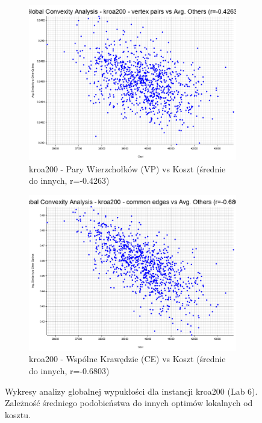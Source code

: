 \documentclass[12pt,a4paper]{article}
\begin{document}
\begin{figure}[H]
\begin{adjustwidth}{-1cm}{-1cm}
    \centering
    \begin{subfigure}[b]{0.8\textwidth}
        \centering
        \includegraphics[width=\textwidth]{output/kroa200_convexity_vertex_pairs_avg_others.png}
        \caption{kroa200 - Pary Wierzchołków (VP) vs Koszt (średnie do innych, r=-0.4263)}
        \label{fig:kroa200_convexity_vp_avg}
    \end{subfigure}
    \hfill
    \begin{subfigure}[b]{0.8\textwidth}
        \centering
        \includegraphics[width=\textwidth]{output/kroa200_convexity_common_edges_avg_others.png}
        \caption{kroa200 - Wspólne Krawędzie (CE) vs Koszt (średnie do innych, r=-0.6803)}
        \label{fig:kroa200_convexity_ce_avg}
    \end{subfigure}
    \caption{Wykresy analizy globalnej wypukłości dla instancji kroa200 (Lab 6). Zależność średniego podobieństwa do innych optimów lokalnych od kosztu.}
    \label{fig:kroa200_convexity_avg_plots}
\end{adjustwidth}
\end{figure}
\end{document}
